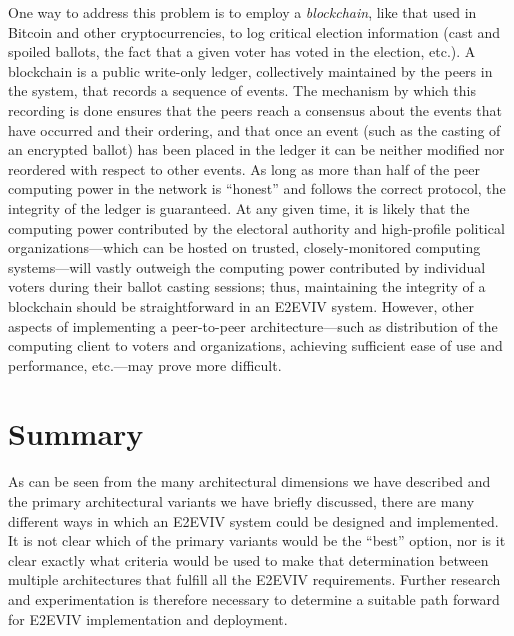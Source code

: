 One way to address this problem is to employ a \emph{blockchain}, like
that used in Bitcoin and other cryptocurrencies, to log critical
election information (cast and spoiled ballots, the fact that a given
voter has voted in the election, etc.). A blockchain is a public
write-only ledger, collectively maintained by the peers in the system,
that records a sequence of events. The mechanism by which this
recording is done ensures that the peers reach a consensus about the
events that have occurred and their ordering, and that once an event
(such as the casting of an encrypted ballot) has been placed in the
ledger it can be neither modified nor reordered with respect to other
events. As long as more than half of the peer computing power in the
network is ``honest'' and follows the correct protocol, the integrity
of the ledger is guaranteed. At any given time, it is likely that the
computing power contributed by the electoral authority and
high-profile political organizations---which can be hosted on trusted,
closely-monitored computing systems---will vastly outweigh the
computing power contributed by individual voters during their ballot
casting sessions; thus, maintaining the integrity of a blockchain
should be straightforward in an E2EVIV system. However, other aspects
of implementing a peer-to-peer architecture---such as distribution of
the computing client to voters and organizations, achieving sufficient
ease of use and performance, etc.---may prove more difficult.

\section{Summary}

As can be seen from the many architectural dimensions we have
described and the primary architectural variants we have briefly
discussed, there are many different ways in which an E2EVIV system
could be designed and implemented. It is not clear which of the
primary variants would be the ``best'' option, nor is it clear exactly
what criteria would be used to make that determination between
multiple architectures that fulfill all the E2EVIV
requirements. Further research and experimentation is therefore
necessary to determine a suitable path forward for E2EVIV
implementation and deployment.

